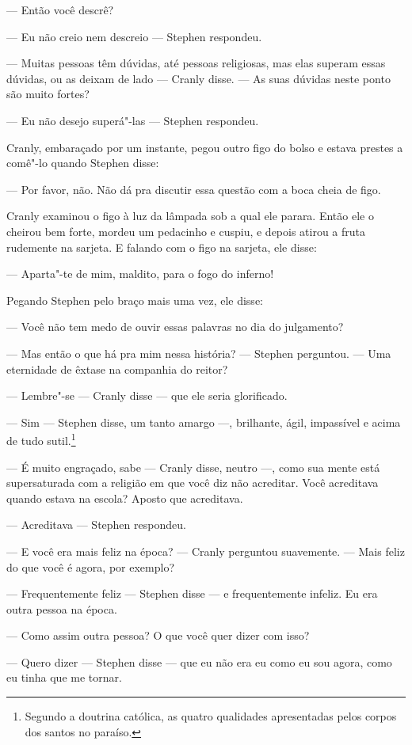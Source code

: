  --- Então você descrê?

 --- Eu não creio nem descreio --- Stephen respondeu.

 --- Muitas pessoas têm dúvidas, até pessoas religiosas, mas elas superam
essas dúvidas, ou as deixam de lado --- Cranly disse. --- As suas dúvidas
neste ponto são muito fortes?

 --- Eu não desejo superá"-las --- Stephen respondeu.

Cranly, embaraçado por um instante, pegou outro figo do bolso e estava
prestes a comê"-lo quando Stephen disse:

 --- Por favor, não. Não dá pra discutir essa questão com a boca cheia de
figo.

Cranly examinou o figo à luz da lâmpada sob a qual ele parara. Então ele
o cheirou bem forte, mordeu um pedacinho e cuspiu, e depois atirou a
fruta rudemente na sarjeta. E falando com o figo na sarjeta, ele disse:

 --- Aparta"-te de mim, maldito, para o fogo do inferno!

Pegando Stephen pelo braço mais uma vez, ele disse:

 --- Você não tem medo de ouvir essas palavras no dia do julgamento?

 --- Mas então o que há pra mim nessa história? --- Stephen perguntou. --- Uma
eternidade de êxtase na companhia do reitor?

 --- Lembre"-se --- Cranly disse --- que ele seria glorificado.

 --- Sim --- Stephen disse, um tanto amargo ---, brilhante, ágil, impassível e
 acima de tudo sutil.\footnote{ Segundo a doutrina católica, as quatro
qualidades apresentadas pelos corpos dos santos no paraíso.}

 --- É muito engraçado, sabe --- Cranly disse, neutro ---, como sua mente está
supersaturada com a religião em que você diz não acreditar. Você
acreditava quando estava na escola? Aposto que acreditava.

 --- Acreditava --- Stephen respondeu.

 --- E você era mais feliz na época? --- Cranly perguntou suavemente. --- Mais
feliz do que você é agora, por exemplo?

 --- Frequentemente feliz --- Stephen disse --- e frequentemente infeliz. Eu era
outra pessoa na época.

 --- Como assim outra pessoa? O que você quer dizer com isso?

 --- Quero dizer --- Stephen disse --- que eu não era eu como eu sou agora, como
eu tinha que me tornar.

